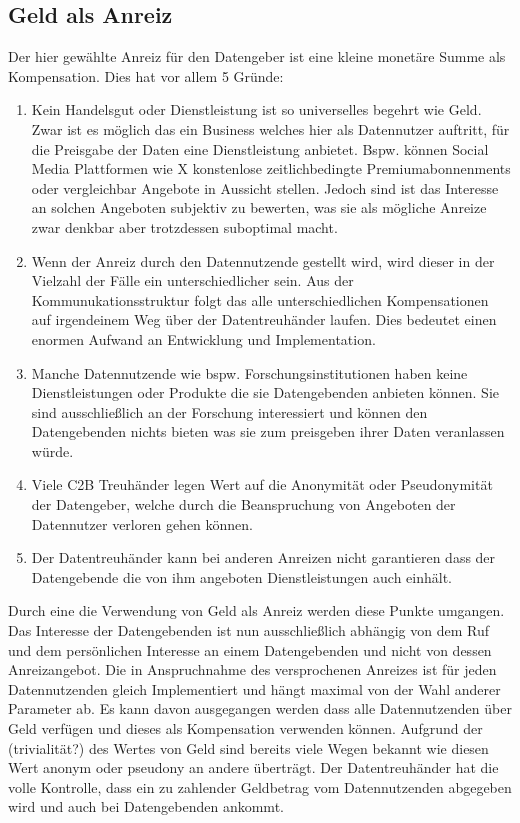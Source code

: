 \documentclass[11pt,a4paper]{scrreprt}
\begin{document}
\subsection{Geld als Anreiz}
Der hier gewählte Anreiz für den Datengeber ist eine kleine monetäre Summe als Kompensation. Dies hat vor allem 5 Gründe:
\begin{enumerate}
    \item Kein Handelsgut oder Dienstleistung ist so universelles begehrt wie Geld. Zwar ist es möglich das ein Business welches hier als Datennutzer auftritt, für die Preisgabe der Daten eine Dienstleistung anbietet. Bspw. können Social Media Plattformen wie X konstenlose zeitlichbedingte Premiumabonnenments oder vergleichbar Angebote in Aussicht stellen. Jedoch sind ist das Interesse an solchen Angeboten subjektiv zu bewerten, was sie als mögliche Anreize zwar denkbar aber trotzdessen suboptimal macht.
    \item Wenn der Anreiz durch den Datennutzende gestellt wird, wird dieser in der Vielzahl der Fälle ein unterschiedlicher sein. Aus der Kommunukationsstruktur folgt das alle unterschiedlichen Kompensationen auf irgendeinem Weg über der Datentreuhänder laufen. Dies bedeutet einen enormen Aufwand an Entwicklung und Implementation.
    \item Manche Datennutzende wie bspw. Forschungsinstitutionen haben keine Dienstleistungen oder Produkte die sie Datengebenden anbieten können. Sie sind ausschließlich an der Forschung interessiert und können den Datengebenden nichts bieten was sie zum preisgeben ihrer Daten veranlassen würde.
    \item Viele C2B Treuhänder legen Wert auf die Anonymität oder Pseudonymität der Datengeber, welche durch die Beanspruchung von Angeboten der Datennutzer verloren gehen können. 
    \item Der Datentreuhänder kann bei anderen Anreizen nicht garantieren dass der Datengebende die von ihm angeboten Dienstleistungen auch einhält. 
\end{enumerate}
Durch eine die Verwendung von Geld als Anreiz werden diese Punkte umgangen. Das Interesse der Datengebenden ist nun ausschließlich abhängig von dem Ruf und dem persönlichen Interesse an einem Datengebenden und nicht von dessen Anreizangebot. Die in Anspruchnahme des versprochenen Anreizes ist für jeden Datennutzenden gleich Implementiert und hängt maximal von der Wahl anderer Parameter ab. Es kann davon ausgegangen werden dass alle Datennutzenden über Geld verfügen und dieses als Kompensation verwenden können. Aufgrund der (trivialität?) des Wertes von Geld sind bereits viele Wegen bekannt wie diesen Wert anonym oder pseudony an andere überträgt. Der Datentreuhänder hat die volle Kontrolle, dass ein zu zahlender Geldbetrag vom Datennutzenden abgegeben wird und auch bei Datengebenden ankommt.\\
\end{document}

